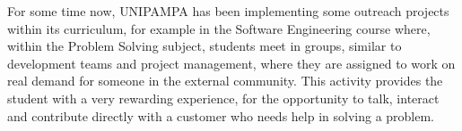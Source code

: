 
For some time now, \ac{UNIPAMPA} has been implementing some outreach projects within its curriculum, for example in the Software Engineering course where, within the Problem Solving subject, students meet in groups, similar to development teams and project management, where they are assigned to work on real demand for someone in the external community.
This activity provides the student with a very rewarding experience, for the opportunity to talk, interact and contribute directly with a customer who needs help in solving a problem.



